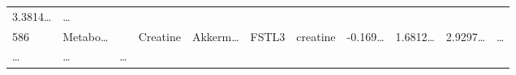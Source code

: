 \documentclass[
]{article}
\begin{document}
\begin{longtable}[]{@{}lllllllllll@{}}
\begin{minipage}[t]{0.07\columnwidth}
3.3814\ldots{}\strut
\end{minipage} & \begin{minipage}[t]{0.03\columnwidth}\raggedright
\ldots{}\strut
\end{minipage}\tabularnewline
\begin{minipage}[t]{0.03\columnwidth}\raggedright
586\strut
\end{minipage} & \begin{minipage}[t]{0.07\columnwidth}\raggedright
Metabo\ldots{}\strut
\end{minipage} & \begin{minipage}[t]{0.07\columnwidth}\raggedright
\strut
\end{minipage} & \begin{minipage}[t]{0.09\columnwidth}\raggedright
Creatine\strut
\end{minipage} & \begin{minipage}[t]{0.07\columnwidth}\raggedright
Akkerm\ldots{}\strut
\end{minipage} & \begin{minipage}[t]{0.07\columnwidth}\raggedright
FSTL3\strut
\end{minipage} & \begin{minipage}[t]{0.09\columnwidth}\raggedright
creatine\strut
\end{minipage} & \begin{minipage}[t]{0.07\columnwidth}\raggedright
-0.169\ldots{}\strut
\end{minipage} & \begin{minipage}[t]{0.07\columnwidth}\raggedright
1.6812\ldots{}\strut
\end{minipage} & \begin{minipage}[t]{0.07\columnwidth}\raggedright
2.9297\ldots{}\strut
\end{minipage} & \begin{minipage}[t]{0.03\columnwidth}\raggedright
\ldots{}\strut
\end{minipage}\tabularnewline
\begin{minipage}[t]{0.03\columnwidth}\raggedright
\ldots{}\strut
\end{minipage} & \begin{minipage}[t]{0.07\columnwidth}\raggedright
\ldots{}\strut
\end{minipage} & \begin{minipage}[t]{0.07\columnwidth}\raggedright
\ldots{}\strut
\end{minipage} & \begin{minipage}[t]{0.09\columnwidth}\raggedright

\end{minipage}
\end{longtable}
\end{document}
